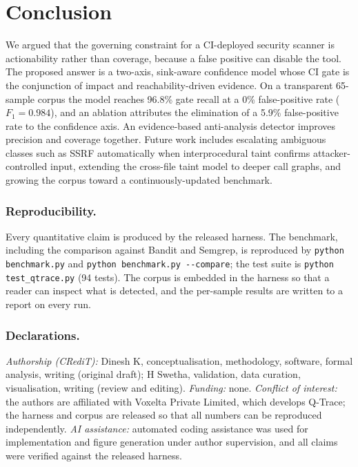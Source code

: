 \documentclass[runningheads]{llncs}
\newcommand{\pct}{\%}
\begin{document}
\section{Conclusion}\label{sec:conclusion}
We argued that the governing constraint for a CI-deployed security scanner is
actionability rather than coverage, because a false positive can disable the tool.
The proposed answer is a two-axis, sink-aware confidence model whose CI gate is
the conjunction of impact and reachability-driven evidence. On a transparent
65-sample corpus the model reaches 96.8\pct{} gate recall at a 0\pct{}
false-positive rate ($F_1 = 0.984$), and an ablation attributes the elimination of
a 5.9\pct{} false-positive rate to the confidence axis. An evidence-based
anti-analysis detector improves precision and coverage together. Future work
includes escalating ambiguous classes such as SSRF automatically when
interprocedural taint confirms attacker-controlled input, extending the cross-file
taint model to deeper call graphs, and growing the corpus toward a
continuously-updated benchmark.

\subsubsection{Reproducibility.}\label{sec:repro}
Every quantitative claim is produced by the released harness. The benchmark,
including the comparison against Bandit and Semgrep, is reproduced by
\texttt{python benchmark.py} and \texttt{python benchmark.py -{}-compare}; the test
suite is \texttt{python test\_qtrace.py} (94 tests). The corpus is embedded in the
harness so that a reader can inspect what is detected, and the per-sample results
are written to a report on every run.

\subsubsection{Declarations.}
\emph{Authorship (CRediT):} Dinesh K, conceptualisation, methodology, software,
formal analysis, writing (original draft); H Swetha, validation, data curation,
visualisation, writing (review and editing). \emph{Funding:} none. \emph{Conflict
of interest:} the authors are affiliated with Voxelta Private Limited, which
develops Q-Trace; the harness and corpus are released so that all numbers can be
reproduced independently. \emph{AI assistance:} automated coding assistance was
used for implementation and figure generation under author supervision, and all
claims were verified against the released harness.
\end{document}
